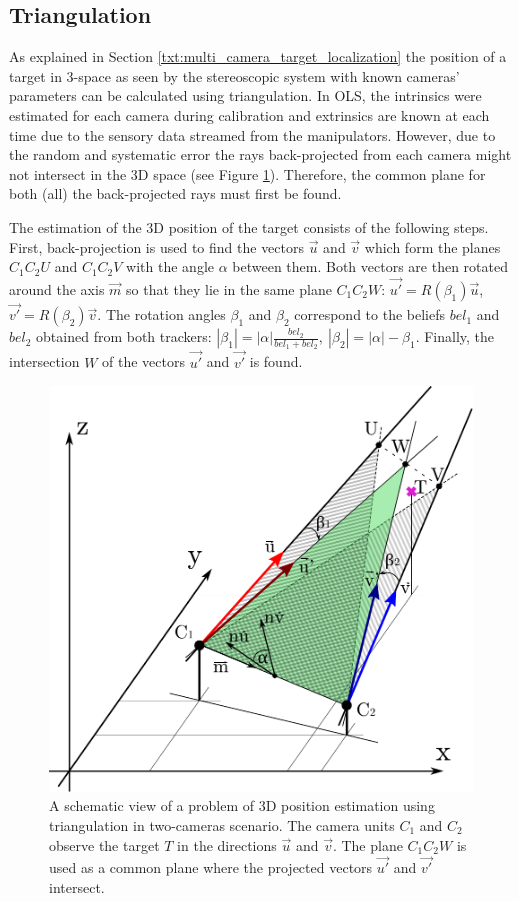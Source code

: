 \subsection{Triangulation} \label{txt:triangulation}

As explained in Section \ref{txt:multi_camera_target_localization} the position of a target in 3-space as seen by the stereoscopic system with known cameras' parameters can be calculated using triangulation. In OLS, the intrinsics were estimated for each camera during calibration and extrinsics are known at each time due to the sensory data streamed from the manipulators. However, due to the random and systematic error the rays back-projected from each camera might not intersect in the 3D space (see Figure \ref{fig:triangulationSchematicView}). Therefore, the common plane for both (all) the back-projected rays must first be found.

The estimation of the 3D position of the target consists of the following steps. First, back-projection is used to find the vectors $\vec{u}$ and $\vec{v}$ which form the planes $C_{1}C_{2}U$ and $C_{1}C_{2}V$ with the angle $\alpha$ between them. Both vectors are then rotated around the axis $\vec{m}$ so that they lie in the same plane $C_{1}C_{2}W$: $\vec{u'} = R(\beta_{1})\vec{u}$, $\vec{v'} = R(\beta_{2})\vec{v}$. The rotation angles $\beta_{1}$ and $\beta_{2}$ correspond to the beliefs $bel_{1}$ and $bel_{2}$ obtained from both trackers: $|\beta_{1}| = |\alpha|\frac{bel_{2}}{bel_{1} + bel_{2}},~|\beta_{2}| = |\alpha| -\beta_{1}$. Finally, the intersection $W$ of the vectors $\vec{u'}$ and $\vec{v'}$ is found.

\begin{figure}[htb]\centering
	\centering
	\includegraphics[width=0.45\linewidth]{fig/triangulation.pdf}
	\caption{A schematic view of a problem of 3D position estimation using triangulation in two-cameras scenario. The camera units $C_{1}$ and $C_{2}$ observe the target $T$ in the directions $\vec{u}$ and $\vec{v}$. The plane $C_{1}C_{2}W$ is used as a common plane where the projected vectors $\vec{u'}$ and $\vec{v'}$ intersect.}
	\label{fig:triangulationSchematicView}
\end{figure}


